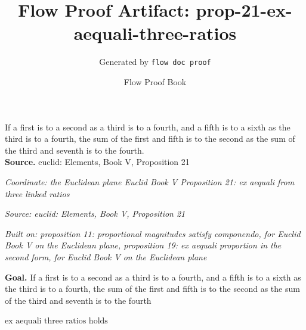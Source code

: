 \documentclass[11pt]{article}
\title{Flow Proof Artifact: prop-21-ex-aequali-three-ratios}
\author{Generated by \texttt{flow doc proof}}
\date{Flow Proof Book}
\theoremstyle{definition}
\begin{document}
\maketitle
If a first is to a second as a third is to a fourth, and a fifth is to a sixth as the third is to a fourth, the sum of the first and fifth is to the second as the sum of the third and seventh is to the fourth.\\[0.5em]
\textbf{Source.} euclid: Elements, Book V, Proposition 21\\[0.5em]
\bigskip
{}\par
\smallskip\noindent\textit{Coordinate: the Euclidean plane \cdot Euclid Book V \cdot Proposition 21: ex aequali from three linked ratios}\par
\smallskip\noindent\textit{Source: euclid: Elements, Book V, Proposition 21}\par
\smallskip\noindent\textit{Built on: proposition 11: proportional magnitudes satisfy componendo, for Euclid Book V on the Euclidean plane, proposition 19: ex aequali proportion in the second form, for Euclid Book V on the Euclidean plane}\par
\medskip
\noindent\textbf{Goal.} If a first is to a second as a third is to a fourth, and a fifth is to a sixth as the third is to a fourth, the sum of the first and fifth is to the second as the sum of the third and seventh is to the fourth\par
\noindent$\displaystyle \text{ex aequali three ratios holds}$\par
\medskip
\noindent
\end{document}

